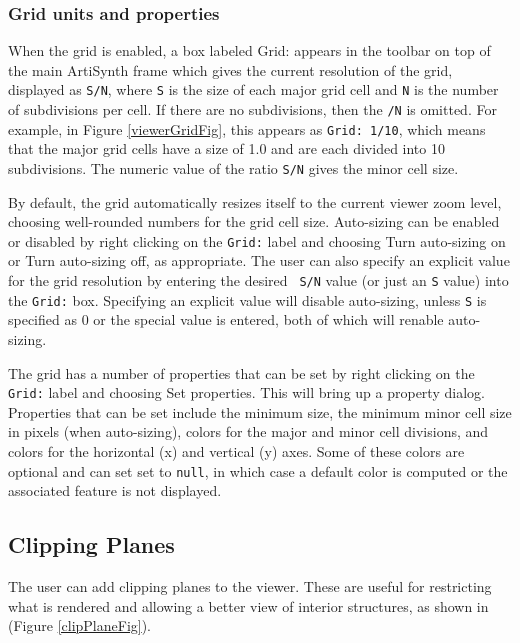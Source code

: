\documentclass{article}
\begin{document}
\subsubsection{Grid units and properties}
\label{GridUnitsAndProperties}

When the grid is enabled, a box labeled {\sf Grid:} appears in the
toolbar on top of the main ArtiSynth frame which gives the current
resolution of the grid, displayed as {\tt S/N}, where {\tt S} is the
size of each major grid cell and {\tt N} is the number of subdivisions
per cell. If there are no subdivisions, then the {\tt /N} is omitted.
For example, in Figure \ref{viewerGridFig}, this appears as {\tt Grid:
1/10}, which means that the major grid cells have a size of 1.0 and
are each divided into 10 subdivisions. The numeric value of the ratio
{\tt S/N} gives the minor cell size.

By default, the grid automatically resizes itself to the current
viewer zoom level, choosing well-rounded numbers for the grid cell
size. Auto-sizing can be enabled or disabled by right clicking on the
{\tt Grid:} label and choosing {\sf Turn auto-sizing on} or {\sf Turn
auto-sizing off}, as appropriate. The user can also specify an
explicit value for the grid resolution by entering the desired {\tt
S/N} value (or just an {\tt S} value) into the {\tt Grid:} box.
Specifying an explicit value will disable auto-sizing, unless {\tt S}
is specified as 0 or the special value {\tt *} is entered, both of
which will renable auto-sizing.

The grid has a number of properties that can be set by right clicking
on the {\tt Grid:} label and choosing {\sf Set properties}. This will
bring up a property dialog. Properties that can be set include the
minimum size, the minimum minor cell size in pixels (when
auto-sizing), colors for the major and minor cell divisions, and
colors for the horizontal (x) and vertical (y) axes. Some of these
colors are optional and can set set to {\tt null}, in which case a
default color is computed or the associated feature is not displayed.

\subsection{Clipping Planes}
\label{ClippingPlanesSec}

The user can add clipping planes to the viewer. These are useful for
restricting what is rendered and allowing a better view of interior
structures, as shown in (Figure \ref{clipPlaneFig}).
\end{document}
